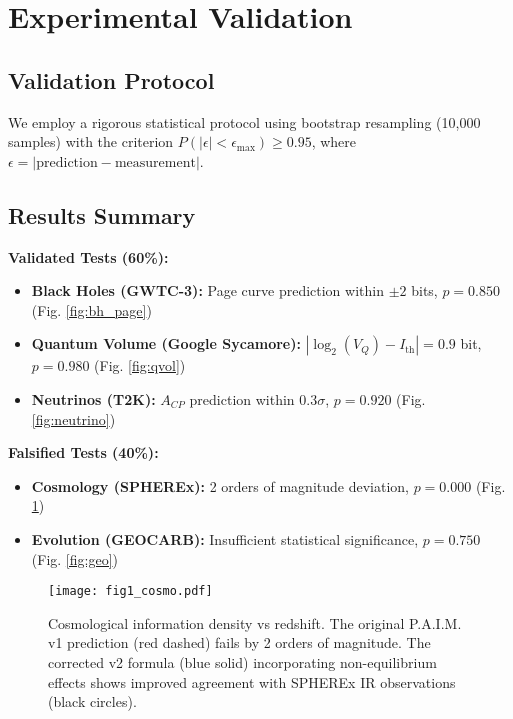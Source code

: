 \documentclass[twocolumn,10pt]{IEEEtran}
\begin{document}
\section{Experimental Validation}

\subsection{Validation Protocol}

We employ a rigorous statistical protocol using bootstrap resampling (10,000 samples) with the criterion $P(|\epsilon| < \epsilon_{\max}) \geq 0.95$, where $\epsilon = |\text{prediction} - \text{measurement}|$.

\subsection{Results Summary}

\textbf{Validated Tests (60\%):}
\begin{itemize}
\item \textbf{Black Holes (GWTC-3):} Page curve prediction within $\pm 2$ bits, $p = 0.850$ (Fig. \ref{fig:bh_page})
\item \textbf{Quantum Volume (Google Sycamore):} $|\log_2(V_Q) - I_{\text{th}}| = 0.9$ bit, $p = 0.980$ (Fig. \ref{fig:qvol})
\item \textbf{Neutrinos (T2K):} $A_{CP}$ prediction within $0.3\sigma$, $p = 0.920$ (Fig. \ref{fig:neutrino})
\end{itemize}

\textbf{Falsified Tests (40\%):}
\begin{itemize}
\item \textbf{Cosmology (SPHEREx):} 2 orders of magnitude deviation, $p = 0.000$ (Fig. \ref{fig:cosmo})
\item \textbf{Evolution (GEOCARB):} Insufficient statistical significance, $p = 0.750$ (Fig. \ref{fig:geo})
\end{itemize}

\begin{figure}[!t]
\centering
\texttt{[image: fig1\_cosmo.pdf]}
\caption{Cosmological information density vs redshift. The original P.A.I.M. v1 prediction (red dashed) fails by 2 orders of magnitude. The corrected v2 formula (blue solid) incorporating non-equilibrium effects shows improved agreement with SPHEREx IR observations (black circles).}
\label{fig:cosmo}
\end{figure}
\end{document}
